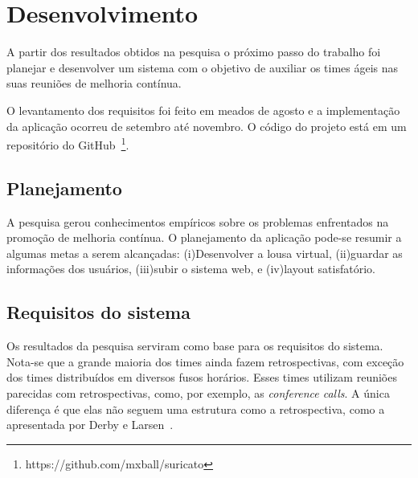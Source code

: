 \section{Desenvolvimento}



A partir dos resultados obtidos na pesquisa o próximo passo do trabalho foi planejar e desenvolver um sistema com o objetivo de auxiliar os times ágeis nas suas reuniões de melhoria contínua.

O levantamento dos requisitos foi feito em meados de agosto e a implementação da aplicação ocorreu de setembro até novembro. O código do projeto está em um repositório do GitHub~\footnote{https://github.com/mxball/suricato}.

\subsection{Planejamento}

A pesquisa gerou conhecimentos empíricos sobre os problemas enfrentados na promoção de melhoria contínua. O planejamento da aplicação pode-se resumir a algumas metas a serem alcançadas: (i)Desenvolver a lousa virtual, (ii)guardar as informações dos usuários, (iii)subir o sistema web, e (iv)layout satisfatório.


\subsection{Requisitos do sistema}

Os resultados da pesquisa serviram como base para os requisitos do sistema. Nota-se que a grande maioria dos times ainda fazem retrospectivas, com exceção dos times distribuídos em diversos fusos horários. Esses times utilizam reuniões parecidas com retrospectivas, como, por exemplo, as \textit{conference calls}. A única diferença é que elas não seguem uma estrutura como a retrospectiva, como a apresentada por Derby e Larsen~\cite{retrospectives}. 

